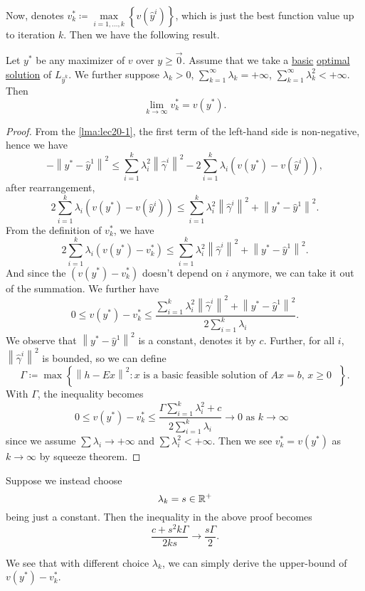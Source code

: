 Now, denotes \(v^{\ast}_{k}\coloneqq \max\limits_{i = 1, \ldots , k}\left\{v(\hat{y}^i)\right\}\), which is just the best function value
up to iteration \(k\). Then we have the following result.
\begin{theorem}\label{thm:lec20-1}
	Let \(y^{\ast}\) be any maximizer of \(v\) over \(y\geq \vec{0}\). Assume that we take a \hyperref[def:basic-solution]{basic} \hyperref[def:optimal-solution]{optimal solution}
	of \(L_{\hat{y}^k}\). We further suppose \(\lambda_{k}>0\), \(\sum\limits_{k=1}^{\infty} \lambda_{k} = +\infty \), \(\sum\limits_{k=1}^{\infty} \lambda_{k}^2< +\infty\). Then
	\[
		\lim_{k \to \infty} v^{\ast}_k = v(y^{\ast}).
	\]
\end{theorem}
\begin{proof}
	From the \autoref{lma:lec20-1}, the first term of the left-hand side is non-negative, hence we have
	\[
		- \left\lVert y^{\ast} - \hat{y}^1\right\rVert^2 \leq \sum\limits_{i=1}^{k} \lambda_{i}^{2}\left\lVert \hat{\gamma}^i\right\rVert^2 - 2 \sum\limits_{i=1}^{k} \lambda_{i}\left(v(y^{\ast}) - v(\hat{y}^i)\right),
	\]
	after rearrangement,
	\[
		2 \sum\limits_{i=1}^{k} \lambda_{i}\left(v(y^{\ast}) - v(\hat{y}^i)\right)\leq \sum\limits_{i=1}^{k} \lambda_{i}^{2}\left\lVert \hat{\gamma}^i\right\rVert^2 + \left\lVert y^{\ast} - \hat{y}^1\right\rVert^2.
	\]
	From the definition of \(v^{\ast}_{k}\), we have
	\[
		2 \sum\limits_{i=1}^{k} \lambda_{i}\left(v(y^{\ast}) - v^{\ast}_{k}\right)\leq \sum\limits_{i=1}^{k} \lambda_{i}^{2}\left\lVert \hat{\gamma}^i\right\rVert^2 + \left\lVert y^{\ast} - \hat{y}^1\right\rVert^2.
	\]
	And since the \(\left(v(y^{\ast}) - v^{\ast}_{k}\right)\) doesn't depend on \(i\) anymore, we can take it out of the summation. We further have
	\[
		0\leq v(y^{\ast}) - v^{\ast}_{k}\leq \frac{\sum\limits_{i=1}^{k} \lambda_{i}^{2}\left\lVert \hat{\gamma}^i\right\rVert^2 + \left\lVert y^{\ast} - \hat{y}^1\right\rVert^2}{2 \sum\limits_{i=1}^{k} \lambda_{i}}.
	\]
	We observe that \(\left\lVert y^{\ast} - \hat{y}^1\right\rVert^2 \) is a constant, denotes it by \(c\). Further, for all \(i\), \(\left\lVert \hat{\gamma}^i\right\rVert^2 \) is bounded, so we can define
	\[
		\Gamma\coloneqq \max\left\{\left\lVert h - Ex\right\rVert^2\colon \text{\(x\) is a basic feasible solution of \(Ax = b\), \(x\geq 0\)  }\right\}.
	\]
	With \(\Gamma\), the inequality becomes
	\[
		0\leq v(y^{\ast}) - v^{\ast}_{k}\leq \frac{\Gamma\sum\limits_{i=1}^{k} \lambda_{i}^{2} + c}{2 \sum\limits_{i=1}^{k} \lambda_{i}}\to 0 \text{ as \(k \to  \infty \) }
	\]
	since we assume \(\sum \lambda_{i} \to  +\infty \) and \(\sum\limits\lambda_{i}^{2}< +\infty  \). Then we see \(v^{\ast}_{k} = v(y^{\ast})\) as \(k \to \infty \) by squeeze theorem.
\end{proof}
\begin{remark}
	Suppose we instead choose
	\[
		\lambda_{k} = s\in\mathbb{\MakeUppercase{R}}^+
	\]
	being just a constant. Then the inequality in the above proof becomes
	\[
		\frac{c + s^2 k \Gamma }{2 k s}\to \frac{s \Gamma}{2}.
	\]

	We see that with different choice \(\lambda_{k}\), we can simply derive the upper-bound of \(v(y^{\ast}) - v^{\ast}_{k}\).
\end{remark}

